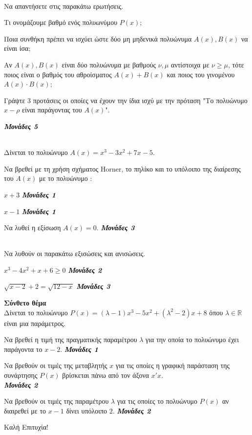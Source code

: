 \documentclass[ektypwsh]{article}
\newcommand{\monades}[1]{
\hspace*{\fill}
\textbf{\textit{\textcolor{black}{Μονάδες #1}}}}
\newcommand{\kaliepityxia}{\vfill
\begin{flushright}
Καλή Επιτυχία!
\end{flushright}}
\begin{document}
\begin{thema}
\item\mbox{}\\
Να απαντήσετε στις παρακάτω ερωτήσεις.
\begin{erwthma}
\item Τι ονομάζουμε βαθμό ενός πολυωνύμου $ P(x) $;
\item Ποια συνθήκη πρέπει να ισχύει ώστε δύο μη μηδενικά πολυώνυμα $ A(x),B(x) $ να είναι ίσα;
\item Αν $ A(x),B(x) $ είναι δύο πολυώνυμα με βαθμούς $ \nu,\mu $ αντίστοιχα με $ \nu\geq\mu $, τότε ποιος είναι ο βαθμός του αθροίσματος $ A(x)+B(x) $ και ποιος του γινομένου $ A(x)\cdot B(x) $;
\item Γράψτε 3 προτάσεις οι οποίες να έχουν την ίδια ισχύ με την πρόταση "Το πολυώνυμο $ x-\rho $ είναι παράγοντας του $ A(x) $".
\end{erwthma}\monades{5}
\item \mbox{}\\
Δίνεται το πολυώνυμο $ A(x)=x^3-3x^2+7x-5 $.
\begin{erwthma}
\item Να βρεθεί με τη χρήση σχήματος Horner, το πηλίκο και το υπόλοιπο της διαίρεσης του $ A(x) $ με το πολυώνυμο :
\begin{alist}
\item $ x+3 $\monades{1}
\item $ x-1 $\monades{1}
\end{alist}
\item Να λυθεί η εξίσωση $ A(x)=0 $.\monades{3}
\end{erwthma}
\item\mbox{}\\
Να λυθούν οι παρακάτω εξισώσεις και ανισώσεις.
\begin{erwthma}
\item $ x^3-4x^2+x+6\geq0 $\monades{2}
\item $ \sqrt{x-2}+2=\sqrt{12-x} $\monades{3}
\end{erwthma}
\item \textbf{Σύνθετο θέμα}\\
Δίνεται το πολυώνυμο $ P(x)=(\lambda-1)x^3-5x^2+(\lambda^2-2)x+8 $ όπου $ \lambda\in\mathbb{R} $ είναι μια παράμετρος. 
\begin{erwthma}
\item Να βρεθεί η τιμή της πραγματικής παραμέτρου $ \lambda $ για την οποία το πολυώνυμο έχει παράγοντα το $ x-2 $.\monades{1}
\item Να βρεθούν οι τιμές της μεταβλητής $ x $ για τις οποίες η γραφική παράσταση της συνάρτησης $ P(x) $ βρίσκεται πάνω από τον άξονα $ x'x $.\\\monades{2}
\item Να βρεθούν οι τιμές της παραμέτρου $ \lambda $ για τις οποίες το πολυώνυμο $ P(x) $ αν διαιρεθεί με το $ x-1 $ δίνει υπόλοιπο $ 2 $.\monades{2}
\end{erwthma}
\end{thema}
\kaliepityxia
\end{document}
